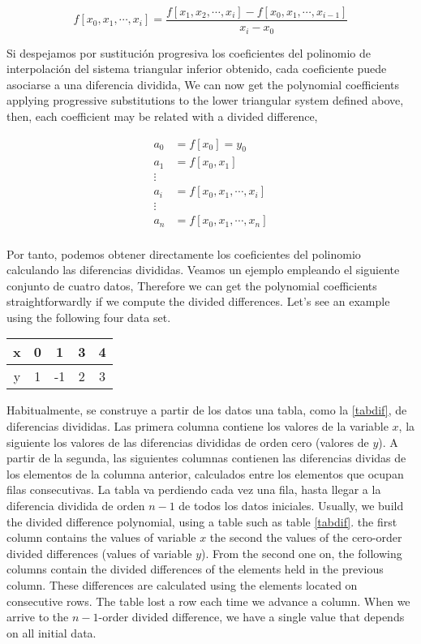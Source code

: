 \begin{equation*}
f\left[x_0,x_1,\cdots,x_i\right]=\frac{f\left[x_1,x_2,\cdots,x_i\right]-f\left[x_0,x_1,\cdots,x_{i-1}\right]}{x_i-x_0}
\end{equation*}																					\begin{paracol}{2}	
Si despejamos por sustitución progresiva los coeficientes del polinomio de interpolación del sistema triangular inferior obtenido, cada coeficiente puede asociarse a una diferencia dividida,
\switchcolumn
We can now get the polynomial coefficients applying progressive substitutions to the lower triangular system defined above, then, each coefficient may be related with a divided difference, 
\end{paracol}
\begin{align*}
a_0&=f\left[x_0\right]=y_0\\
a_1&=f\left[x_0,x_1\right]\\
\vdots\\
a_i&=f\left[x_0,x_1,\cdots,x_i\right]\\
\vdots\\
a_n&=f\left[x_0,x_1,\cdots,x_n\right]\\
\end{align*}																					\begin{paracol}{2}			
Por tanto, podemos obtener directamente los coeficientes del polinomio calculando las diferencias divididas. Veamos un ejemplo empleando el siguiente conjunto de cuatro datos,
\switchcolumn
Therefore we can get the polynomial coefficients straightforwardly if we compute the divided differences. Let's see an example using the following four data set. 
\end{paracol}
\begin{table}[h]
\centering
\begin{tabular}{c|cccc}
x&0&1&3&4\\
\hline
y&1&-1&2&3
\end{tabular}
\end{table}
\begin{paracol}{2}
Habitualmente, se construye a partir de los datos una tabla, como la  \ref{tabdif}, de diferencias divididas. Las primera columna contiene los valores de la variable $x$, la siguiente los valores de las diferencias divididas de orden cero (valores de $y$). A partir de la segunda, las siguientes columnas contienen las diferencias dividas de los elementos de la columna anterior, calculados entre los elementos que ocupan filas consecutivas. La tabla va perdiendo cada vez una fila, hasta llegar a la diferencia dividida de orden $n-1$ de todos los datos iniciales.
\switchcolumn
Usually, we build the divided difference polynomial, using a table such as table \ref{tabdif}. the first column contains the values of variable $x$ the second the values of the cero-order divided differences (values of variable $y$). From the second one on, the following columns contain the divided differences of the elements held in the  previous column. These differences are calculated using the elements located on consecutive rows. The table lost a row each time we advance a column. When we arrive to the $n-1$-order divided difference, we have a single value that depends on all initial data.     
\end{paracol}
